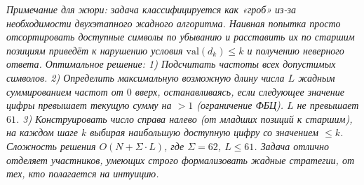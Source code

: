 \textit{Примечание для жюри: задача классифицируется как «гроб» из-за необходимости двухэтапного жадного алгоритма. Наивная попытка просто отсортировать доступные символы по убыванию и расставить их по старшим позициям приведёт к нарушению условия $\text{val}(d_k) \le k$ и получению неверного ответа. Оптимальное решение: 
1) Подсчитать частоты всех допустимых символов.
2) Определить максимальную возможную длину числа $L$ жадным суммированием частот от $0$ вверх, останавливаясь, если следующее значение цифры превышает текущую сумму на $>1$ (ограничение ФБЦ). $L$ не превышает $61$.
3) Конструировать число справа налево (от младших позиций к старшим), на каждом шаге $k$ выбирая наибольшую доступную цифру со значением $\le k$. 
Сложность решения $O(N + \Sigma \cdot L)$, где $\Sigma = 62$, $L \le 61$. Задача отлично отделяет участников, умеющих строго формализовать жадные стратегии, от тех, кто полагается на интуицию.}